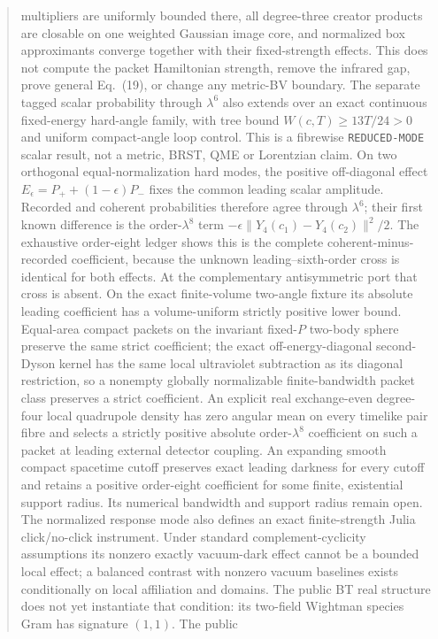 \documentclass[11pt]{article}
\theoremstyle{definition}
\theoremstyle{remark}
\begin{document}
\begin{abstract}
multipliers are uniformly bounded there, all degree-three creator products
are closable on one weighted Gaussian image core, and normalized box
approximants converge together with their fixed-strength effects.  This does
not compute the packet Hamiltonian strength, remove the infrared gap, prove
general Eq.~(19), or change any metric-BV boundary.
The separate tagged scalar probability through $\lambda^6$ also extends over
an exact continuous fixed-energy hard-angle family, with tree bound
$W(c,T)\geq13T/24>0$ and uniform compact-angle loop control.  This is a
fibrewise \texttt{REDUCED-MODE} scalar result, not a metric, BRST, QME or
Lorentzian claim.
On two orthogonal equal-normalization hard modes, the positive off-diagonal
effect $E_\epsilon=P_++(1-\epsilon)P_-$ fixes the common leading scalar
amplitude.  Recorded and coherent probabilities therefore agree through
$\lambda^6$; their first known difference is the order-$\lambda^8$ term
$-\epsilon\|Y_4(c_1)-Y_4(c_2)\|^2/2$.  The exhaustive order-eight ledger
shows this is the complete coherent-minus-recorded coefficient, because the
unknown leading--sixth-order cross is identical for both effects.  At the
complementary antisymmetric port that cross is absent.  On the exact
finite-volume two-angle fixture its absolute leading coefficient has a
volume-uniform strictly positive lower bound.  Equal-area compact packets on
the invariant fixed-$P$ two-body sphere preserve the same strict coefficient;
the exact off-energy-diagonal second-Dyson kernel has the same local
ultraviolet subtraction as its diagonal restriction, so a nonempty globally
normalizable finite-bandwidth packet class preserves a strict coefficient.
An explicit real exchange-even degree-four local quadrupole density has zero
angular mean on every timelike pair fibre and selects a strictly positive
absolute order-$\lambda^8$ coefficient on such a packet at leading external
detector coupling.  An expanding smooth compact spacetime cutoff preserves
exact leading darkness for every cutoff and retains a positive order-eight
coefficient for some finite, existential support radius.  Its numerical
bandwidth and support radius remain open.  The normalized response mode also
defines an exact finite-strength Julia click/no-click instrument.  Under
standard complement-cyclicity assumptions its nonzero exactly vacuum-dark
effect cannot be a bounded local effect; a balanced contrast with nonzero
vacuum baselines exists conditionally on local affiliation and domains.  The
public BT real structure does not yet instantiate that condition: its
two-field Wightman species Gram has signature $(1,1)$.  The public

\end{abstract}
\end{document}
